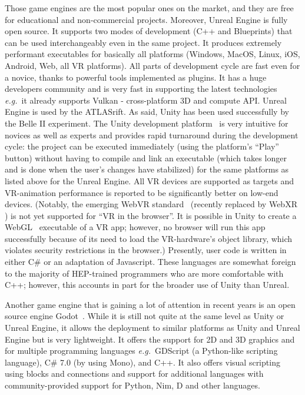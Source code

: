 \documentclass[12pt,a4paper]{article}
\begin{document}
Those game engines are the most popular ones on the market, and they are free for educational and non-commercial projects.
Moreover, Unreal Engine is fully open source. It supports two modes of development (C++ and Blueprints) that can be used
interchangeably even in the same project. It produces extremely performant executables for basically all platforms
(Windows, MacOS, Linux, iOS, Android, Web, all VR platforms). All parts of development cycle are fast even for a novice,
thanks to powerful tools implemented as plugins. It has a huge developers community and is very fast in supporting the
latest technologies {\it e.g.}\ it already supports Vulkan - cross-platform 3D and compute API. Unreal Engine is used by the ATLASrift.
As said, Unity has been used successfully by the Belle II experiment. The Unity development platform~\cite{Unity3D} is very
intuitive for novices as well as experts and provides rapid turnaround during the development cycle: the project can be
executed immediately (using the platform’s ``Play'' button) without having to compile and link an executable (which takes
longer and is done when the user’s changes have stabilized) for the same platforms as listed above for the Unreal Engine.
All VR devices are supported as targets and VR-animation performance is reported to be significantly better on low-end devices.
(Notably, the emerging WebVR standard~\cite{WebVR} (recently replaced by WebXR \cite{WebXR}) is not yet supported for ``VR in the browser''. It is possible in Unity to create a
WebGL~\cite{WebGL2011} executable of a VR app; however, no browser will run this app successfully because of its need to load the
VR-hardware’s object library, which violates security restrictions in the browser.) Presently, user code is written in either
C\# or an adaptation of Javascript. These languages are somewhat foreign to the majority of HEP-trained programmers who are more comfortable with
C++; however, this accounts in part for the broader use of Unity than Unreal.

Another game engine that is gaining a lot of attention in recent years is an open source engine Godot~\cite{Godot}. 
While it is still not quite at the same level as Unity or Unreal Engine, it allows the deployment to similar platforms as Unity and Unreal Engine but is very lightweight. 
It offers the support for 2D and 3D graphics and for multiple programming languages {\it e.g.}\ GDScript (a Python-like scripting language), C\# 7.0 (by using Mono), and C++. 
It also offers visual scripting using blocks and connections and support for additional languages with community-provided support for Python, Nim, D and other languages.
\end{document}
